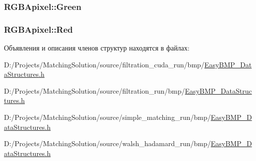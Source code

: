 \hypertarget{struct_r_g_b_apixel_9a9cd569a585a627910620a7b13690e7}{
\subsubsection[{Green}]{ {\bf RGBApixel::Green}}}
\label{struct_r_g_b_apixel_9a9cd569a585a627910620a7b13690e7}


\hypertarget{struct_r_g_b_apixel_0d2e09cc0a67fd3da76b17289146fc26}{
\subsubsection[{Red}]{ {\bf RGBApixel::Red}}}
\label{struct_r_g_b_apixel_0d2e09cc0a67fd3da76b17289146fc26}




Объявления и описания членов структур находятся в файлах:\begin{CompactItemize}
\item 
D:/Projects/MatchingSolution/source/filtration\_\-cuda\_\-run/bmp/\hyperlink{filtration__cuda__run_2bmp_2_easy_b_m_p___data_structures_8h}{EasyBMP\_\-DataStructures.h}\item 
D:/Projects/MatchingSolution/source/filtration\_\-run/bmp/\hyperlink{filtration__run_2bmp_2_easy_b_m_p___data_structures_8h}{EasyBMP\_\-DataStructures.h}\item 
D:/Projects/MatchingSolution/source/simple\_\-matching\_\-run/bmp/\hyperlink{simple__matching__run_2bmp_2_easy_b_m_p___data_structures_8h}{EasyBMP\_\-DataStructures.h}\item 
D:/Projects/MatchingSolution/source/walsh\_\-hadamard\_\-run/bmp/\hyperlink{walsh__hadamard__run_2bmp_2_easy_b_m_p___data_structures_8h}{EasyBMP\_\-DataStructures.h}\end{CompactItemize}
